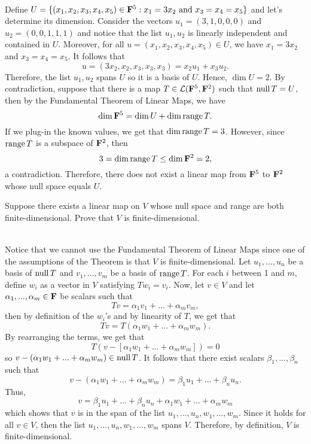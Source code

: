 \begin{solution}
    \\ Define $U = \{(x_1, x_2, x_3, x_4, x_5) \in \mathbf{F}^5 : x_1 = 3x_2 \text{ and } x_3 = x_4 = x_5\}$ and let's determine its dimension. Consider the vectors $u_1 = (3,1,0,0,0)$ and $u_2 = (0,0,1,1,1)$ and notice that the list $u_1, u_2$ is linearly independent and contained in $U$. Moreover, for all $u = (x_1, x_2, x_3, x_4, x_5) \in U$, we have $x_1 = 3x_2$ and $x_3 = x_4 = x_5$. It follows that
    $$u = (3x_2, x_2, x_3, x_3, x_3) = x_2 u_1 + x_3 u_2.$$
    Therefore, the list $u_1, u_2$ spans $U$ so it is a basis of $U$. Hence, $\dim U = 2$. By contradiction, suppose that there is a map $T \in \mathcal{L}(\mathbf{F}^5, \mathbf{F}^2)$ such that $\operatorname{\text{null}} T = U$, then by the Fundamental Theorem of Linear Maps, we have
    $$\dim \mathbf{F}^5 = \dim U + \dim \operatorname{\text{range}} T.$$
    If we plug-in the known values, we get that $\dim \operatorname{\text{range}} T = 3$. However, since $\operatorname{\text{range}} T$ is a subspace of $\mathbf{F}^2$, then
    $$3 = \dim \operatorname{\text{range}} T \leq \dim \mathbf{F}^2 = 2,$$
    a contradiction. Therefore, there does not exist a linear map from $\mathbf{F}^5$ to $\mathbf{F}^2$ whose null space equals $U$.\\
\end{solution}

\begin{exercise}
    Suppose there exists a linear map on $V$ whose null space and range are both finite-dimensional. Prove that $V$ is finite-dimensional. \\
\end{exercise}

\begin{solution}
    \\ Notice that we cannot use the Fundamental Theorem of Linear Maps since one of the assumptions of the Theorem is that $V$ is finite-dimensional. Let $u_1, ..., u_n$ be a basis of $\operatorname{\text{null}} T$ and $v_1, ..., v_m$ be a basis of $\operatorname{\text{range}} T$. For each $i$ between 1 and $m$, define $w_i$ as a vector in $V$ satisfying $Tw_i = v_i$. Now, let $v \in V$ and let $\alpha_1, ..., \alpha_m \in \mathbf{F}$ be scalars such that
    $$Tv = \alpha_1 v_1 + ... + \alpha_m v_m,$$
    then by definition of the $w_i$'s and by linearity of $T$, we get that
    $$Tv = T(\alpha_1 w_1 + ... + \alpha_m w_m).$$
    By rearranging the terms, we get that
    $$T(v - [\alpha_1 w_1 + ... + \alpha_m w_m]) = 0$$
    so $v - (\alpha_1 w_1 + ... + \alpha_m w_m) \in \operatorname{\text{null}} T$. It follows that there exist scalars $\beta_1, ..., \beta_n$ such that
    $$v - (\alpha_1 w_1 + ... + \alpha_m w_m) = \beta_1 u_1 + ... + \beta_n u_n.$$
    Thus,
    $$v = \beta_1 u_1 + ... + \beta_n u_n + \alpha_1 w_1 + ... + \alpha_m w_m$$
    which shows that $v$ is in the span of the list $u_1, ..., u_n, w_1, ..., w_m$. Since it holds for all $v \in V$, then the list $u_1, ..., u_n, w_1, ..., w_m$ spans $V$. Therefore, by definition, $V$ is finite-dimensional.\\
\end{solution}

